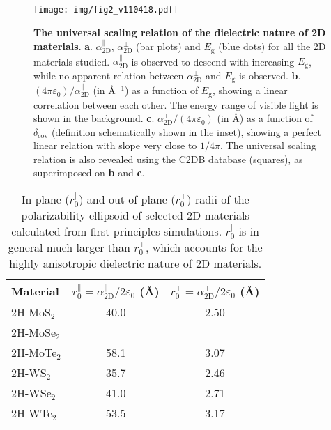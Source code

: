 \documentclass[journal=ancac3,manuscript=article,email=true,hyperref=true,keywords=false]{achemso}
\begin{document}
\begin{figure}[H]
\centering
\texttt{[image: img/fig2\_v110418.pdf]}
\caption{\label{fig-3} \textbf{The universal scaling relation of the
    dielectric nature of 2D
    materials}. \textbf{a}. $\alpha_{\mathrm{2D}}^{\parallel}$, $\alpha_{\mathrm{2D}}^{\perp}$
  (bar plots) and $E_{\mathrm{g}}$ (blue dots) for all the 2D
  materials studied.  $\alpha_{\mathrm{2D}}^{\parallel}$ is observed to descend with
  increasing $E_{\mathrm{g}}$, while no apparent relation between
  $\alpha_{\mathrm{2D}}^{\perp}$ and $E_{\mathrm{g}}$ is
  observed. \textbf{b}. $(4\pi \varepsilon_{0})/\alpha_{\mathrm{2D}}^{\parallel}$
  (in \AA{}$^{-1}$) as a function of $E_{\mathrm{g}}$, showing a linear
  correlation between each other. The energy range of visible light is
  shown in the
  background. \textbf{c}. $\alpha_{\mathrm{2D}}^{\perp}/(4\pi\varepsilon_{0})$ (in
  \AA{}) as a function of $\delta_{\mathrm{cov}}$ (definition
  schematically shown in the inset), showing a perfect linear relation
  with slope very close to $1/4\pi$. The universal scaling relation is
  also revealed using the C2DB database (squares), as superimposed on \textbf{b}
  and \textbf{c}.}
\end{figure}

\begin{table}[H]
  \centering
  \caption{In-plane ($r_{0}^{\parallel}$) and out-of-plane
    ($r_{0}^{\perp}$) radii of the polarizability ellipsoid of
    selected 2D materials calculated from first principles
    simulations. $r_{0}^{\parallel}$ is in general much larger than
    $r_{0}^{\perp}$, which accounts for the highly anisotropic
    dielectric nature of 2D materials.}
  \label{tbl:radii}  
  \begin{tabular}{lcc}
    \hline
    Material & $r_{0}^{\parallel} = \alpha_{\mathrm{2D}}^{\parallel}/2\varepsilon_{0}$ (\AA{}) &  $r_{0}^{\perp} = \alpha_{\mathrm{2D}}^{\perp}/2\varepsilon_{0}$ (\AA{})\\
    \hline
    2H-MoS$_{2}$ & 40.0 & 2.50 \\
    2H-MoSe$_{2}$ & &  \\
    2H-MoTe$_{2}$ & 58.1 & 3.07  \\
    2H-WS$_{2}$ & 35.7 & 2.46  \\
    2H-WSe$_{2}$ & 41.0 & 2.71 \\
    2H-WTe$_{2}$ & 53.5 &  3.17\\
    \hline
  \end{tabular}
\end{table}
\end{document}
